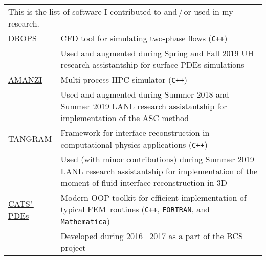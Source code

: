 \documentclass[a4paper,12pt]{article}
\begin{document}
	\begin{longtable}{ l >{\raggedright\arraybackslash}p{15cm} }
		\multicolumn{2}{p{17cm}}{This is the list of software I contributed to and\,/\,or used in my research.}\vspace{3mm}\\
		\href{https://www.igpm.rwth-aachen.de/DROPS/}{DROPS}
			& CFD tool for simulating two-phase flows (\texttt{C++})\vspace{1mm}\\
			& Used and augmented during Spring and Fall 2019 UH research assistantship for surface PDEs simulations\vspace{3mm}\\
		\href{https://github.com/amanzi}{AMANZI}
			& Multi-process HPC simulator (\texttt{C++})\vspace{1mm}\\
			& Used and augmented during Summer 2018 and Summer 2019 LANL research assistantship for implementation of the ASC method\vspace{3mm}\\
		\href{https://github.com/laristra/tangram}{TANGRAM}
			& Framework for interface reconstruction in computational physics applications (\texttt{C++})\vspace{1mm}\\
			& Used (with minor contributions) during Summer 2019 LANL research assistantship for implementation of the moment-of-fluid interface reconstruction in 3D\vspace{3mm}\\
		\href{https://github.com/CATSPDEs/}{CATS'\,PDEs}
			& Modern OOP toolkit for efficient implementation of typical FEM~routines (\texttt{C++}, \texttt{FORTRAN}, and \texttt{Mathematica})\vspace{1mm}\\
			& Developed during 2016\,--\,2017 as a part of the BCS project
	\end{longtable}
	
	\vfill
	
	\begin{flushright}
		\small
	\end{flushright}
		
\end{document}
